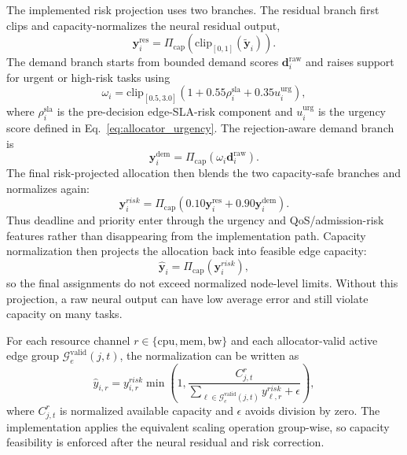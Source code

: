 The implemented risk projection uses two branches. The residual branch first clips and capacity-normalizes the neural residual output,
\begin{equation}
\mathbf{y}^{\mathrm{res}}_i=
\Pi_{\mathrm{cap}}\!\left(\mathrm{clip}_{[0,1]}(\tilde{\mathbf{y}}_i)\right).
\label{eq:residual_capacity_branch}
\end{equation}
The demand branch starts from bounded demand scores $\mathbf{d}^{\mathrm{raw}}_i$ and raises support for urgent or high-risk tasks using
\begin{equation}
\omega_i=\mathrm{clip}_{[0.5,3.0]}
\left(1+0.55\rho_i^{\mathrm{sla}}+0.35u_i^{\mathrm{urg}}\right),
\label{eq:risk_demand_weight}
\end{equation}
where $\rho_i^{\mathrm{sla}}$ is the pre-decision edge-SLA-risk component and $u_i^{\mathrm{urg}}$ is the urgency score defined in Eq.~\eqref{eq:allocator_urgency}. The rejection-aware demand branch is
\begin{equation}
\mathbf{y}^{\mathrm{dem}}_i=
\Pi_{\mathrm{cap}}\!\left(\omega_i\mathbf{d}^{\mathrm{raw}}_i\right).
\label{eq:risk_demand_branch}
\end{equation}
The final risk-projected allocation then blends the two capacity-safe branches and normalizes again:
\begin{equation}
\mathbf{y}^{risk}_i=
\Pi_{\mathrm{cap}}\!\left(
0.10\mathbf{y}^{\mathrm{res}}_i+
0.90\mathbf{y}^{\mathrm{dem}}_i
\right).
\label{eq:risk_projection_detail}
\end{equation}
Thus deadline and priority enter through the urgency and QoS/admission-risk features rather than disappearing from the implementation path. Capacity normalization then projects the allocation back into feasible edge capacity:
\begin{equation}
\hat{\mathbf{y}}_i = \Pi_{\mathrm{cap}}(\mathbf{y}^{risk}_i),
\label{eq:cap_projection_main}
\end{equation}
so the final assignments do not exceed normalized node-level limits. Without this projection, a raw neural output can have low average error and still violate capacity on many tasks.

For each resource channel $r\in\{\mathrm{cpu},\mathrm{mem},\mathrm{bw}\}$ and each allocator-valid active edge group $\mathcal{G}^{\mathrm{valid}}_e(j,t)$, the normalization can be written as
\begin{equation}
\hat{y}_{i,r} =
y^{risk}_{i,r}
\min\left(1,\frac{C^r_{j,t}}{\sum_{\ell\in\mathcal{G}^{\mathrm{valid}}_e(j,t)}y^{risk}_{\ell,r}+\epsilon}\right),
\label{eq:cap_norm_detail}
\end{equation}
where $C^r_{j,t}$ is normalized available capacity and $\epsilon$ avoids division by zero. The implementation applies the equivalent scaling operation group-wise, so capacity feasibility is enforced after the neural residual and risk correction.

